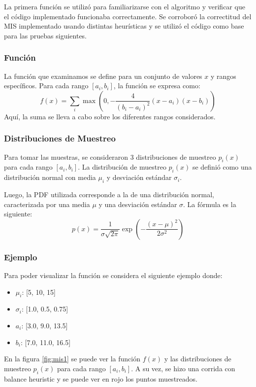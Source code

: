 \documentclass{article}
\begin{document}
La primera función se utilizó para familiarizarse con el algoritmo y verificar que el código implementado funcionaba correctamente.
Se corroboró la correctitud del MIS implementado usando distintas heurísticas y se utilizó el código como base para las pruebas siguientes.

\subsubsection{Función}
La función que examinamos se define para un conjunto de valores \( x \) y rangos específicos. Para cada rango \( [a_{i}, b_{i}] \), la función se expresa como:
$$
f(x) = \sum_{i} \max\left(0, -\frac{4}{(b_{i} - a_{i})^2} (x - a_{i})(x - b_{i})\right)
$$
Aquí, la suma se lleva a cabo sobre los diferentes rangos considerados.

\subsubsection{Distribuciones de Muestreo}

Para tomar las muestras, se consideraron 3 distribuciones de muestreo \( p_{i}(x) \) para cada rango \( [a_{i}, b_{i}] \).
La distribución de muestreo \( p_{i}(x) \) se definió como una distribución normal con media \( \mu_{i} \) y desviación estándar \( \sigma_{i} \).

Luego, la PDF utilizada corresponde a la de una distribución normal, caracterizada por una media \( \mu \) y una desviación estándar \( \sigma \). La fórmula es la siguiente:
$$
p(x) = \frac{1}{\sigma \sqrt{2\pi}} \exp\left(-\frac{(x - \mu)^2}{2\sigma^2}\right)
$$


\subsubsection{Ejemplo}

Para poder visualizar la función se considera el siguiente ejemplo donde:

\begin{itemize}
    \item \textbf{\( \mu_{i} \)}: [5, 10, 15]
    \item \textbf{\( \sigma_{i} \)}: [1.0, 0.5, 0.75]
    \item \textbf{\( a_{i} \)}: [3.0, 9.0, 13.5]
    \item \textbf{\( b_{i} \)}: [7.0, 11.0, 16.5]
\end{itemize}

En la figura \ref{fig:mis1} se puede ver la función \( f(x) \) y las distribuciones de muestreo \( p_{i}(x) \) para cada rango \( [a_{i}, b_{i}] \).
A su vez, se hizo una corrida con balance heuristic y se puede ver en rojo los puntos muestreados.
\end{document}
